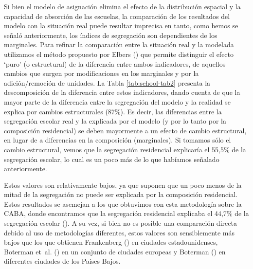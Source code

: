 \documentclass[
  spanish,
  a4paper,%
  chapterprefix=true,%
  DIV=calc,%
  twoside]{scrbook}%
\begin{document}
Si bien el modelo de asignación elimina el efecto de la distribución
espacial y la capacidad de absorción de las escuelas, la comparación de
los resultados del modelo con la situación real puede resultar imprecisa
en tanto, como hemos se señaló anteriormente, los índices de segregación
son dependientes de los marginales. Para refinar la comparación entre la
situación real y la modelada utilizamos el método propuesto por
Elbers () que permite distinguir el efecto `puro' (o estructural) de
la diferencia entre ambos indicadores, de aquellos cambios que surgen
por modificaciones en los marginales y por la adición/remoción de
unidades. La Tabla \ref{tab:school-tab2} presenta la descomposición de
la diferencia entre estos indicadores, dando cuenta de que la mayor
parte de la diferencia entre la segregación del modelo y la realidad se
explica por cambios estructurales (87\%). Es decir, las diferencias entre
la segregación escolar real y la explicada por el modelo (y por lo tanto
por la composición residencial) se deben mayormente a un efecto de
cambio estructural, en lugar de a diferencias en la composición
(marginales). Si tomamos sólo el cambio estructural, vemos que la
segregación residencial explicaría el
55,5\%
de la segregación escolar, lo cual es un poco más de lo que habíamos
señalado anteriormente.

Estos valores son relativamente bajos, ya que suponen que un poco menos
de la mitad de la segregación no puede ser explicada por la composición
residencial. Estos resultados se asemejan a los que obtuvimos con esta
metodología sobre la CABA, donde encontramos que la segregación
residencial explicaba el 44,7\% de la segregación escolar ().
A su vez, si bien no es posible una comparación directa debido al uso de
metodologías diferentes, estos valores son sensiblemente más bajos que
los que obtienen Frankenberg () en ciudades estadounidenses,
Boterman et~al. () en un conjunto de ciudades europeas y Boterman () en
diferentes ciudades de los Países Bajos.
\end{document}
